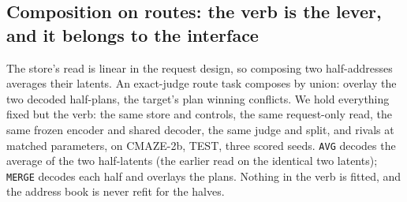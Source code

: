 \documentclass{article} %
\begin{document}
\subsection{Composition on routes: the verb is the lever, and it belongs to the interface}
\label{sec:verb}

The store's read is linear in the request design, so composing two half-addresses averages
their latents. An exact-judge route task composes by union: overlay the two decoded half-plans,
the target's plan winning conflicts. We hold everything fixed but the verb: the same store and
controls, the same request-only read, the same frozen encoder and shared decoder, the same
judge and split, and rivals at matched parameters, on CMAZE-2b, TEST, three scored seeds.
\texttt{AVG} decodes the average of the two half-latents (the earlier read on the identical two
latents); \texttt{MERGE} decodes each half and overlays the plans. Nothing in the verb is
fitted, and the address book is never refit for the halves. %
\end{document}
